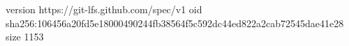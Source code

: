 version https://git-lfs.github.com/spec/v1
oid sha256:106456a20fd5e18000490244fb38564f5c592dc44ed822a2cab72545dae41e28
size 1153
